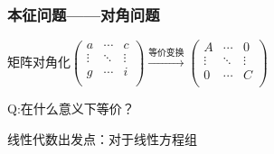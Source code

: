 \subsubsection{本征问题——对角问题}
矩阵对角化$
\left( \begin{matrix}
    a&      \cdots&     c\\
    \vdots&     \ddots&     \vdots\\
    g&      \cdots&     i\\
\end{matrix} \right) \xrightarrow{\text{等价变换}}\left( \begin{matrix}
    A&      \cdots&     0\\
    \vdots&     \ddots&     \vdots\\
    0&      \cdots&     C\\
\end{matrix} \right) 
$

Q:在什么意义下等价？

线性代数出发点：对于线性方程组

